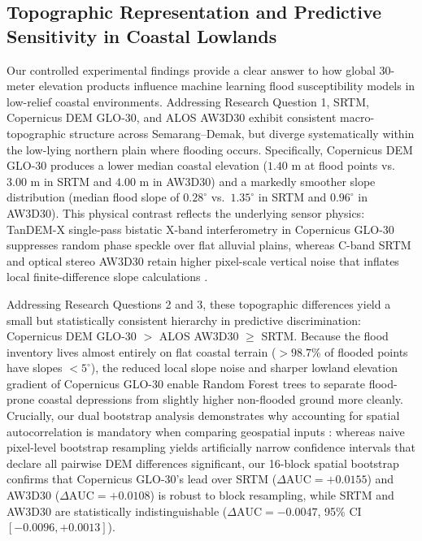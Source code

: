 \documentclass[11pt,twoside]{article}
\begin{document}
\subsection{Topographic Representation and Predictive Sensitivity in Coastal Lowlands}\label{subsec:discussion-performance}

Our controlled experimental findings provide a clear answer to how global 30-meter elevation products influence machine learning flood susceptibility models in low-relief coastal environments. Addressing Research Question 1, SRTM, Copernicus DEM GLO-30, and ALOS AW3D30 exhibit consistent macro-topographic structure across Semarang--Demak, but diverge systematically within the low-lying northern plain where flooding occurs. Specifically, Copernicus DEM GLO-30 produces a lower median coastal elevation ($1.40\text{ m}$ at flood points vs.\ $3.00\text{ m}$ in SRTM and $4.00\text{ m}$ in AW3D30) and a markedly smoother slope distribution (median flood slope of $0.28^\circ$ vs.\ $1.35^\circ$ in SRTM and $0.96^\circ$ in AW3D30). This physical contrast reflects the underlying sensor physics: TanDEM-X single-pass bistatic X-band interferometry in Copernicus GLO-30 suppresses random phase speckle over flat alluvial plains, whereas C-band SRTM and optical stereo AW3D30 retain higher pixel-scale vertical noise that inflates local finite-difference slope calculations \cite{farr2007,tadono2016,esa_glo30,meadows2024}.

Addressing Research Questions 2 and 3, these topographic differences yield a small but statistically consistent hierarchy in predictive discrimination: Copernicus DEM GLO-30 $>$ ALOS AW3D30 $\ge$ SRTM. Because the flood inventory lives almost entirely on flat coastal terrain ($>98.7\%$ of flooded points have slopes $<5^\circ$), the reduced local slope noise and sharper lowland elevation gradient of Copernicus GLO-30 enable Random Forest trees to separate flood-prone coastal depressions from slightly higher non-flooded ground more cleanly. Crucially, our dual bootstrap analysis demonstrates why accounting for spatial autocorrelation is mandatory when comparing geospatial inputs \cite{roberts2017,ploton2020}: whereas naive pixel-level bootstrap resampling yields artificially narrow confidence intervals that declare all pairwise DEM differences significant, our 16-block spatial bootstrap confirms that Copernicus GLO-30's lead over SRTM ($\Delta\text{AUC} = +0.0155$) and AW3D30 ($\Delta\text{AUC} = +0.0108$) is robust to block resampling, while SRTM and AW3D30 are statistically indistinguishable ($\Delta\text{AUC} = -0.0047$, 95\% CI $[-0.0096, +0.0013]$).
\end{document}
